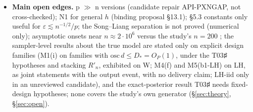 \begin{itemize}
\item \textbf{Main open edges.} p $\gg$ n versions (candidate repair API-PXNGAP, not cross-checked); N1 for general $h$ (binding proposal §13.1); §5.3 constants only useful for $\varepsilon\lesssim n^{-1/2}/p$; the Song--Liang separation is not proved (numerical only); asymptotic onsets near $n\approx2\cdot10^6$ versus the study's $n=200$ ; the sampler-level results about the true model are stated only on explicit design families (M1(i) on families with $\mathrm{osc}\,d\le D_*=O_P(1)$, under the T03♯ hypotheses and stacking $R'_n$, exhibited on W; M4(f) and M5(b1-LH) on LH, as joint statements with the output event, with no delivery claim; LH-iid only in an unreviewed candidate), and the exact-posterior result T03♯ needs fixed-design hypotheses; none covers the study's own generator (\S\ref{sec:theory}, \S\ref{sec:open}).
\end{itemize}

